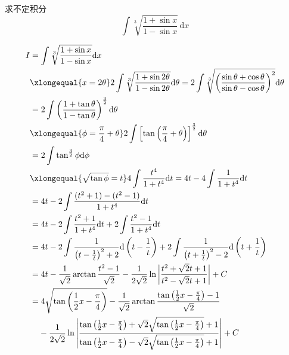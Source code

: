 \documentclass[color=green,titlestyle=hang]{elegantbook}%
\begin{document}
\begin{exercise}求不定积分\begin{equation*}
\int\sqrt[3]{\frac{1+\sin x}{1-\sin x}}\,\mathrm{d}x
\end{equation*}\end{exercise}
\begin{Solution}
\begin{align*}
I&=\int\sqrt[3]{\frac{1+\sin x}{1-\sin x}}\mathrm{d}x\\
&\xlongequal{x=2\theta}2\int\sqrt[3]{\frac{1+\sin 2\theta}{1-\sin 2\theta}}\mathrm{d}\theta=2\int\sqrt[3]{\left(\frac{\sin\theta+\cos\theta}{\sin\theta-\cos\theta}\right)^2}\mathrm{d}\theta\\
&=2\int\left(\frac{1+\tan\theta}{1-\tan\theta}\right)^{\frac{3}{2}}\mathrm{d}\theta\\
&\xlongequal{\phi=\frac{\pi}{4}+\theta}2\int\left[\tan\left(\frac{\pi}{4}+\theta\right)\right]^{\frac{3}{2}}\mathrm{d}\theta\\
&=2\int\tan^{\frac{3}{2}}\phi\mathrm{d}\phi\\
&\xlongequal{\sqrt{\tan \phi}=t}4\int\frac{t^4}{1+t^4}\mathrm{d}t=4t-4\int\frac{1}{1+t^4}\mathrm{d}t\\
&=4t-2\int\frac{(t^2+1)-(t^2-1)}{1+t^4}\mathrm{d}t\\
&=4t-2\int\frac{t^2+1}{1+t^4}\mathrm{d}t+2\int\frac{t^2-1}{1+t^4}\mathrm{d}t\\
&=4t-2\int\frac{1}{\left(t-\frac{1}{t}\right)^2+2}\mathrm{d}\left(t-\frac{1}{t}\right)+2\int\frac{1}{\left(t+\frac{1}{t}\right)^2-2}\mathrm{d}\left(t+\frac{1}{t}\right)\\
&=4t-\frac{1}{\sqrt{2}}\arctan\frac{t^2-1}{\sqrt{2}}-\frac{1}{2\sqrt{2}}\ln\left|\frac{t^2+\sqrt{2}t+1}{t^2-\sqrt{2}t+1}\right|+C\\
&=4\sqrt{\tan\left(\frac{1}{2}x-\frac{\pi}{4}\right)}-\frac{1}{\sqrt{2}}\arctan\frac{\tan\left(\frac{1}{2}x-\frac{\pi}{4}\right)-1}{\sqrt{2}}\\
&\phantom{=\;}-\frac{1}{2\sqrt{2}}\ln\left|\frac{\tan\left(\frac{1}{2}x-\frac{\pi}{4}\right)+\sqrt{2}\sqrt{\tan\left(\frac{1}{2}x-\frac{\pi}{4}\right)}+1}{\tan\left(\frac{1}{2}x-\frac{\pi}{4}\right)-\sqrt{2}\sqrt{\tan\left(\frac{1}{2}x-\frac{\pi}{4}\right)}+1}\right|+C	
\end{align*}
\end{Solution}
\end{document}
